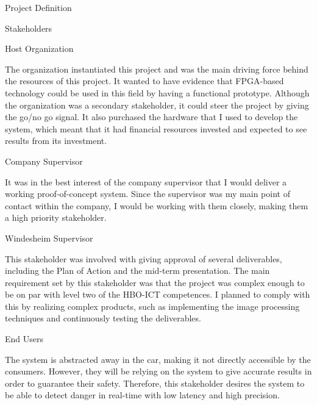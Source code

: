 \documentclass{matthijs}
\begin{document}
\begin{hoofdstuk}{Project Definition}
\begin{paragraaf}{Stakeholders}
			\begin{subparagraaf}{Host Organization}

				The organization instantiated this project and was the main driving force behind the resources of this project.
				It wanted to have evidence that FPGA-based technology could be used in this field by having a functional prototype.
				Although the organization was a secondary stakeholder, it could steer the project by giving the go/no go signal.
				It also purchased the hardware that I used to develop the system, which meant that it had financial resources invested and expected to see results from its investment.

			\end{subparagraaf}

			\begin{subparagraaf}{Company Supervisor}

				It was in the best interest of the company supervisor that I would deliver a working proof-of-concept system.
				Since the supervisor was my main point of contact within the company, I would be working with them closely, making them a high priority stakeholder.


			\end{subparagraaf}

			\begin{subparagraaf}{Windesheim Supervisor}

				This stakeholder was involved with giving approval of several deliverables, including the Plan of Action and the mid-term presentation.
				The main requirement set by this stakeholder was that the project was complex enough to be on par with level two of the HBO-ICT competences.
				I planned to comply with this by realizing complex products, such as implementing the image processing techniques and continuously testing the deliverables.

			\end{subparagraaf}

			\begin{subparagraaf}{End Users}

				The system is abstracted away in the car, making it not directly accessible by the consumers.
				However, they will be relying on the system to give accurate results in order to guarantee their safety.
				Therefore, this stakeholder desires the system to be able to detect danger in real-time with low latency and high precision.

			\end{subparagraaf}

		\end{paragraaf}

	\end{hoofdstuk}
	
\end{document}
